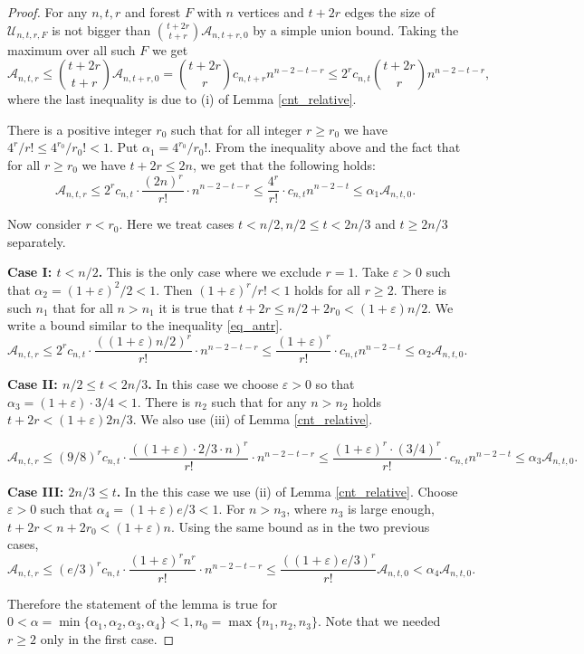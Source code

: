 \documentclass[11pt,letterpaper]{amsart}
\newcommand{\eps}{\varepsilon}
\renewcommand{\le}{\leqslant}
\renewcommand{\ge}{\geqslant}
\newcommand{\aaa}{\mathcal{A}}
\newcommand{\uu}{\mathcal U}
\begin{document}
\begin{proof}
    For any $n, t, r$ and forest $F$ with $n$ vertices and $t+2r$ edges the size of $\uu_{n, t, r, F}$ is not bigger than ${t+2r\choose t+r}\aaa_{n, t+r, 0}$ by a simple union bound. Taking the maximum over all such $F$ we get $$\aaa_{n, t, r} \le {t+2r\choose t+r}\aaa_{n, t+r, 0} = {t+2r\choose r}c_{n, t+r}n^{n-2-t-r} \leqslant 2^rc_{n, t}{t+2r\choose r}n^{n-2-t-r},$$ where the last inequality is due to (i) of Lemma \ref{cnt_relative}.

    There is a positive integer $r_0$ such that for all integer $r \ge r_0$ we have $4^r/r! \le  4^{r_0}/r_0! < 1$. Put $\alpha_1 = 4^{r_0}/r_0!$. From the inequality above and the fact that for all $r \ge r_0$ we have $t+2r \le 2n$, we get that the following holds: \begin{equation}\label{eq_antr}\aaa_{n, t, r} \le 2^rc_{n, t}\cdot\frac{(2n)^r}{r!}\cdot n^{n-2-t-r} \leqslant \frac{4^r}{r!}\cdot c_{n, t}n^{n-2-t} \leqslant \alpha_1\aaa_{n, t, 0}.\end{equation}

    Now consider $r < r_0$. Here we treat cases $t < n/2, n/2\le t<2n/3$ and $t \ge 2n/3$ separately. 
    
    \textbf{Case I: $t < n/2$.} This is the only case where we exclude $r=1$.  Take $\eps > 0$ such that $\alpha_2 = (1+\eps)^2/2 < 1$. Then $(1+\eps)^r/r! < 1$ holds for all $r \ge 2$. There is such $n_1$ that for all $n > n_1$ it is true that $t+2r \le n/2 + 2r_0 < (1 + \eps)n/2.$ We write a bound similar to the inequality \eqref{eq_antr}. $$\aaa_{n, t, r} \le 2^rc_{n, t}\cdot\frac{((1+\eps)n/2)^r}{r!}\cdot n^{n-2-t-r} \leqslant \frac{(1+\eps)^r}{r!}\cdot c_{n, t}n^{n-2-t} \leqslant \alpha_2\aaa_{n, t, 0}.$$

    
    \textbf{Case II: $n/2 \le t < 2n/3$.} In this case we choose $\eps > 0$ so that $\alpha_3 = (1+\eps)\cdot 3/4 < 1$. There is $n_2$ such that for any $n > n_2$ holds $t+2r < (1+\eps)2n/3$. We also use (iii) of Lemma \ref{cnt_relative}. 

    $$\aaa_{n, t, r} \le (9/8)^rc_{n, t}\cdot\frac{((1+\eps)\cdot 2/3\cdot n)^r}{r!}\cdot n^{n-2-t-r} \leqslant \frac{(1+\eps)^r\cdot(3/4)^r}{r!}\cdot c_{n, t}n^{n-2-t} \leqslant \alpha_3\aaa_{n, t, 0}.$$
    
    \textbf{Case III: $2n/3\le t$.} In the this case we use (ii) of Lemma \ref{cnt_relative}. Choose $\eps > 0$ such that $\alpha_4 = (1 + \eps)e/3 < 1$. For $n > n_3$, where $n_3$ is large enough, $t+2r < n + 2r_0 < (1 + \eps)n$. Using the same bound as in the two previous cases, 
    $$\aaa_{n, t, r} \le (e/3)^r c_{n, t}\cdot\frac{(1+\eps)^rn^r}{r!}\cdot n^{n-2-t-r} \le \frac{((1+\eps)e/3)^r}{r!}\aaa_{n, t, 0} < \alpha_4\aaa_{n, t ,0}.$$

    Therefore the statement of the lemma is true for $0 < \alpha = \min\{\alpha_1, \alpha_2, \alpha_3, \alpha_4\} < 1, n_0 = \max\{n_1, n_2, n_3\}$. Note that we needed $r \ge 2$ only in the first case.
    
\end{proof}
\end{document}
